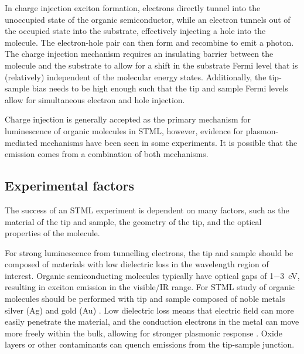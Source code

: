 In charge injection exciton formation, electrons directly tunnel into the unoccupied state of the organic semiconductor, while an electron tunnels out of the occupied state into the substrate, effectively injecting a hole into the molecule. The electron-hole pair can then form and recombine to emit a photon. The charge injection mechanism requires an insulating barrier between the molecule and the substrate to allow for a shift in the substrate Fermi level that is (relatively) independent of the molecular energy states. Additionally, the tip-sample bias needs to be high enough such that the tip and sample Fermi levels allow for simultaneous electron and hole injection.

Charge injection is generally accepted as the primary mechanism for luminescence of organic molecules in \ac{STML}, however, evidence for plasmon-mediated mechanisms have been seen in some experiments.  It is possible that the emission comes from a combination of both mechanisms.




\begin{figure} [h]
    \centering
    \caption{ }
    \label{fig:exptech:2-mechanisms}
\end{figure}



\subsection{Experimental factors}

The success of an \ac{STML} experiment is dependent on many factors, such as the material of the tip and sample, the geometry of the tip, and the optical properties of the molecule.

For strong luminescence from tunnelling electrons, the tip and sample should be composed of materials with low dielectric loss in the wavelength region of interest. Organic semiconducting molecules typically have optical gaps of 1\SI{-3}{eV}, resulting in exciton emission in the visible/IR range. For \ac{STML} study of organic molecules should be performed with tip and sample composed of noble metals silver (Ag) \citep{yang2015optical} and gold (Au) \citep{olmon2012optical}. Low dielectric loss means that electric field can more easily penetrate the material, and the conduction electrons in the metal can move more freely within the bulk, allowing for stronger plasmonic response \citep{novotny2012principles}. Oxide layers or other contaminants can quench emissions from the tip-sample junction.

